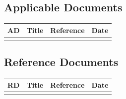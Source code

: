 \subsection{Applicable Documents}

\noindent
\begin{tabularx}{1.0\textwidth}{ | l | X | c | c |}
\hline
\rowcolor{gray!30}
\textbf{AD} & \textbf{Title} & \textbf{Reference} & \textbf{Date}\\
\hline
&&& \\
\hline
\end{tabularx}

\vspace{+1cm}
\subsection{Reference Documents}





\noindent
\begin{tabularx}{1.0\textwidth}{ | l | X | c | c |}
\hline
\rowcolor{gray!30}
\textbf{RD} & \textbf{Title} & \textbf{Reference} & \textbf{Date}\\
\hline
&&& \\
\hline
\end{tabularx}


